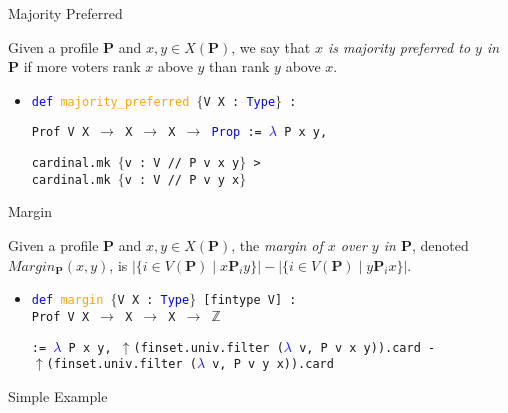 \documentclass[12pt,xcolor=svgnames,blue,aspectratio=169]{beamer}
\begin{document}
\begin{frame}{Majority Preferred}

\begin{definition}\label{MajPrefDef} \textnormal{Given a profile $\mathbf{P}$ and $x,y\in X(\mathbf{P})$, we say that \textit{$x$ is majority preferred to $y$ in $\mathbf{P}$} if more voters rank $x$ above $y$ than rank $y$ above $x$.}\end{definition}

 \vfill 
 \pause
\begin{itemize}
\item[] \texttt{\textcolor{blue}{def} \textcolor{orange}{majority\_preferred}  $\{$V X : \textcolor{blue}{Type}$\}$ :}

\texttt{Prof V X $\to$ X $\to$ X $\to$ \textcolor{blue}{Prop} := \textcolor{blue}{$\lambda$} P x y,}

\texttt{cardinal.mk $\{$v : V // P v x y$\}$ >\\
cardinal.mk $\{$v : V // P v y x$\}$}
\end{itemize}

\end{frame}

\begin{frame}{Margin}


\begin{definition}\label{MarginDef} \textnormal{Given a profile $\mathbf{P}$ and $x,y\in X(\mathbf{P})$, the \textit{margin of $x$ over $y$ in $\mathbf{P}$}, denoted $Margin_\mathbf{P}(x,y)$, is $|\{i\in V(\mathbf{P})\mid x\mathbf{P}_iy\}|-|\{i\in V(\mathbf{P})\mid y\mathbf{P}_ix\}|$.}
\end{definition}
 
 \vfill 
 \pause
\begin{itemize}
\item[] \texttt{\textcolor{blue}{def} \textcolor{orange}{margin} $\{$V X : \textcolor{blue}{Type}$\}$  [fintype V] : \\ Prof V X $\to$ X $\to$ X $\to$ $\mathbb{Z}$} 

\texttt{:=
    \textcolor{blue}{$\lambda$} P x y, $\uparrow$(finset.univ.filter (\textcolor{blue}{$\lambda$} v, P v x y)).card
        -} \\ \texttt{$\uparrow$(finset.univ.filter (\textcolor{blue}{$\lambda$} v, P v y x)).card}
\end{itemize}

\end{frame}

\begin{frame}

{\Huge Simple Example}

\end{frame}
\end{document}
